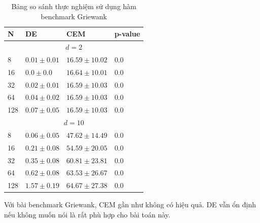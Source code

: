 \documentclass[10pt]{report}
\begin{document}
\begin{table}[H]\centering
	\caption{Bảng so sánh thực nghiệm sử dụng hàm benchmark Griewank}
	\begin{tabularx}{0.8\textwidth}{p{5em}XXl}
		\toprule
		\textbf{N} & \textbf{DE}                & \textbf{CEM}        & \textbf{p-value} \\
		\midrule
		\multicolumn{4}{c}{\(d = 2\)}                                                    \\
		\midrule
		8          & \(\mathbf{0.01 \pm 0.01}\) & \(16.59 \pm 10.02\) & \(\mathbf{0.0}\) \\
		16         & \(\mathbf{0.0 \pm 0.0}\)   & \(16.64 \pm 10.01\) & \(\mathbf{0.0}\) \\
		32         & \(\mathbf{0.02 \pm 0.01}\) & \(16.59 \pm 10.03\) & \(\mathbf{0.0}\) \\
		64         & \(\mathbf{0.04 \pm 0.02}\) & \(16.59 \pm 10.03\) & \(\mathbf{0.0}\) \\
		128        & \(\mathbf{0.07 \pm 0.05}\) & \(16.59 \pm 10.03\) & \(\mathbf{0.0}\) \\
		\midrule
		\multicolumn{4}{c}{\(d = 10\)}                                                   \\
		\midrule
		8          & \(\mathbf{0.06 \pm 0.05}\) & \(47.62 \pm 14.49\) & \(\mathbf{0.0}\) \\
		16         & \(\mathbf{0.21 \pm 0.08}\) & \(54.59 \pm 20.05\) & \(\mathbf{0.0}\) \\
		32         & \(\mathbf{0.35 \pm 0.08}\) & \(60.81 \pm 23.81\) & \(\mathbf{0.0}\) \\
		64         & \(\mathbf{0.62 \pm 0.08}\) & \(63.53 \pm 26.67\) & \(\mathbf{0.0}\) \\
		128        & \(\mathbf{1.57 \pm 0.19}\) & \(64.67 \pm 27.38\) & \(\mathbf{0.0}\) \\
		\bottomrule
	\end{tabularx}
\end{table}

Với bài benchmark Griewank, CEM gần như không có hiệu quả. DE vẫn ổn định nếu không muốn nói là rất phù hợp cho bài toán này.
\end{document}
